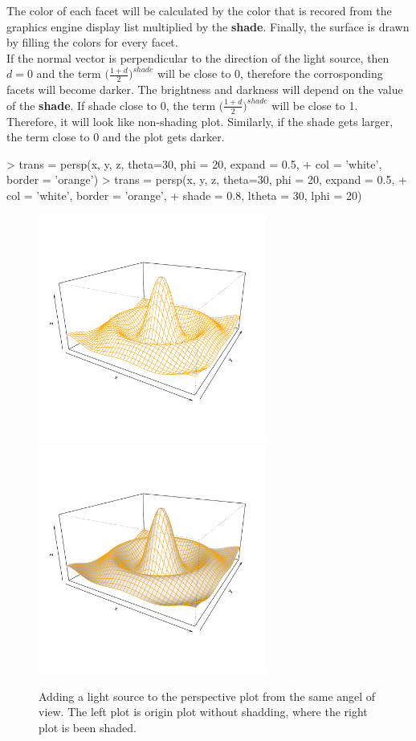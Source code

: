 \documentclass[paper=a4, fontsize=11pt]{report}
\begin{document}
The color of each facet will be calculated by the color that is recored from the graphics engine display list multiplied by the \textbf{shade}. Finally, the surface is drawn by filling the colors for every facet.\\

If the normal vector is perpendicular to the direction of the light source, then $d = 0$ and the term $\big(\frac{1 + d}{2}\big)^{shade}$ will be close to 0, therefore the corrosponding facets will become darker. The brightness and darkness will depend on the value of the \textbf{shade}. If shade close to 0, the term $\big(\frac{1 + d}{2}\big)^{shade}$ will be close to 1. Therefore, it will look like non-shading plot. Similarly, if the shade gets larger, the term close to 0 and the plot gets darker.

\begin{Schunk}
\begin{Sinput}
> trans = persp(x, y, z, theta=30, phi = 20, expand = 0.5,
+ col = 'white', border = 'orange')
> trans = persp(x, y, z, theta=30, phi = 20, expand = 0.5,
+ col = 'white', border = 'orange', 
+ shade = 0.8, ltheta = 30, lphi = 20)
\end{Sinput}
\end{Schunk}


\begin{figure}[h]
	\begin{center}
		\includegraphics[height = 7.5cm, width = 7.5cm]{figure/Lighting_1.pdf}
		\includegraphics[height = 7.5cm, width = 7.5cm]{figure/Lighting_2.pdf}
		\caption{Adding a light source to the perspective plot from the same angel of view. The left plot is origin plot without shadding, where the right plot is been shaded.}
		\label{figure_3.3}
	\end{center}
\end{figure}
\end{document}
